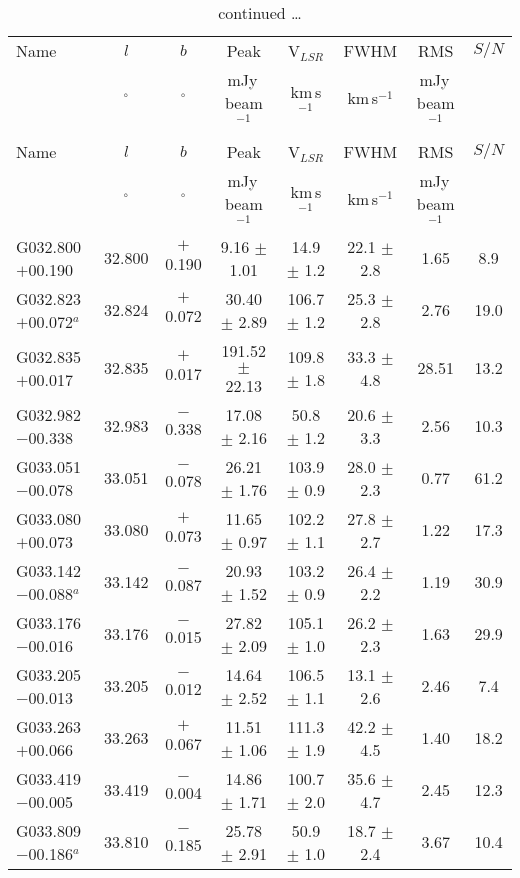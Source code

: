 \begin{ThreePartTable}
\begin{longtable}{lccccccc}
\caption{Catalog of 319 RRL detections towards 244 ``known'' HII regions from the WISE catalog\label{tab_HII_known}} \\
\hline
\hline
Name & $l$ & $b$ & Peak& V$_{LSR}$& FWHM& RMS& $S/N$\\
&$^\circ$&$^\circ$&mJy\,beam$^{-1}$&km\,s$^{-1}$&km\,s$^{-1}$&mJy\,beam$^{-1}$& \\
\hline
\endfirsthead
\caption{continued \ldots}\\
\hline
\hline
Name & $l$ & $b$ & Peak& V$_{LSR}$& FWHM& RMS& $S/N$\\
&$^\circ$&$^\circ$&mJy\,beam$^{-1}$&km\,s$^{-1}$&km\,s$^{-1}$&mJy\,beam$^{-1}$& \\
\hline
\endhead
\hline
\endfoot
\hline
\endlastfoot
G032.800$+$00.190     &32.800&	$+$0.190	&9.16	$\pm$ 1.01	&14.9	$\pm$ 1.2	&22.1	$\pm$ 2.8	&1.65	&8.9 \\ 
G032.823$+$00.072$^a$ &32.824&	$+$0.072	&30.40	$\pm$ 2.89	&106.7	$\pm$ 1.2	&25.3	$\pm$ 2.8	&2.76	&19.0\\
G032.835$+$00.017     &32.835&	$+$0.017	&191.52	$\pm$ 22.13	&109.8	$\pm$ 1.8	&33.3	$\pm$ 4.8	&28.51	&13.2\\
G032.982$-$00.338     &32.983&	$-$0.338	&17.08	$\pm$ 2.16	&50.8	$\pm$ 1.2	&20.6	$\pm$ 3.3	&2.56	&10.3\\
G033.051$-$00.078     &33.051&	$-$0.078	&26.21	$\pm$ 1.76	&103.9	$\pm$ 0.9	&28.0	$\pm$ 2.3	&0.77	&61.2\\
G033.080$+$00.073     &33.080&	$+$0.073	&11.65	$\pm$ 0.97	&102.2	$\pm$ 1.1	&27.8	$\pm$ 2.7	&1.22	&17.3\\
G033.142$-$00.088$^a$ &33.142&	$-$0.087	&20.93	$\pm$ 1.52	&103.2	$\pm$ 0.9	&26.4	$\pm$ 2.2	&1.19	&30.9\\
G033.176$-$00.016     &33.176&	$-$0.015	&27.82	$\pm$ 2.09	&105.1	$\pm$ 1.0	&26.2	$\pm$ 2.3	&1.63	&29.9\\
G033.205$-$00.013     &33.205&	$-$0.012	&14.64	$\pm$ 2.52	&106.5	$\pm$ 1.1	&13.1	$\pm$ 2.6	&2.46	&7.4\\
G033.263$+$00.066     &33.263&	$+$0.067	&11.51	$\pm$ 1.06	&111.3	$\pm$ 1.9	&42.2	$\pm$ 4.5	&1.40	&18.2\\
G033.419$-$00.005     &33.419&	$-$0.004	&14.86	$\pm$ 1.71	&100.7	$\pm$ 2.0	&35.6	$\pm$ 4.7	&2.45	&12.3\\
G033.809$-$00.186$^a$ &33.810&	$-$0.185	&25.78	$\pm$ 2.91	&50.9	$\pm$ 1.0	&18.7	$\pm$ 2.4	&3.67	&10.4\\

\end{longtable}
\end{ThreePartTable}
